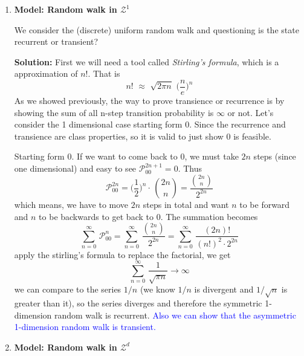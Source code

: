 \documentclass[10.5pt]{article}
\newcommand{\prob}[0]{\mathcal{P}}
\newcommand{\hilight}[1]{\colorbox{orange!20}{#1}}
\newenvironment{changemargin}[2]{%
  \begin{list}{}{%
    \setlength{\topsep}{0pt}%
    \setlength{\leftmargin}{#1}%
    \setlength{\rightmargin}{#2}%
    \setlength{\listparindent}{\parindent}%
    \setlength{\itemindent}{\parindent}%
    \setlength{\parsep}{\parskip}%
  }%
  \item[]}{\end{list}}
\begin{document}
\begin{changemargin}{-0.125in}{0in}
\begin{enumerate}
      \item \textbf{Model: Random walk in $\mathcal{Z}^1$}
      
      \medskip
      
      We consider the (discrete) uniform random walk and questioning is the state recurrent or transient? 
      
      \medskip
      
      \textbf{Solution:} First we will need a tool called \textit{Stirling's formula}, which is a approximation of $n!$. That is 
      \[
      n! \,\, \approx \,\,\sqrt{2\pi n}\,\,\big(\frac{n}{e}\big)^n
      \]
      As we showed previously, the way to prove transience or recurrence is by showing the sum of all n-step transition probability is $\infty$ or not. Let's consider the 1 dimensional case starting form 0. Since the recurrence and transience are class properties, so it is valid to just show 0 is feasible. 
      
      \medskip
      
      Starting form 0. If we want to come back to 0, we must take $2n$ steps (since one dimensional) and easy to see $\prob_{00}^{2n+1} = 0$. Thus 
      \[
      \prob_{00}^{2n} = \bigg(\frac{1}{2}\bigg)^n \cdot \,\binom{2n}{n} = \frac{\binom{2n}{n}}{2^{2n}}
      \]
      which means, we have to move $2n$ steps in total and want $n$ to be forward and $n$ to be backwards to get back to 0. The summation becomes 
      \[
      \sum_{n = 0}^\infty\,\prob^n_{00} = \sum_{n = 0}^\infty\,\frac{\binom{2n}{n}}{2^{2n}} = \sum_{n = 0}^\infty\, \frac{(2n)!}{(n!)^2\cdot 2^{2n}}
      \]
      apply the stirling's formula to replace the factorial, we get 
      \[
      \sum_{n = 0}^\infty\, \frac{1}{\sqrt{\pi n}} \rightarrow \infty
      \]
      we can compare to the series $1/n$ (we know $1/n$ is divergent and $1/\sqrt{n}$ is greater than it), so the series diverges and therefore the \hilight{symmetric 1-dimension random walk is recurrent.} \textcolor{blue}{Also we can show that the asymmetric 1-dimension random walk is transient.}
      
      \medskip
      
      \item \textbf{Model: Random walk in $\mathcal{Z}^d$}
      
      \smallskip
       

\end{enumerate}
\end{changemargin}
\end{document}
